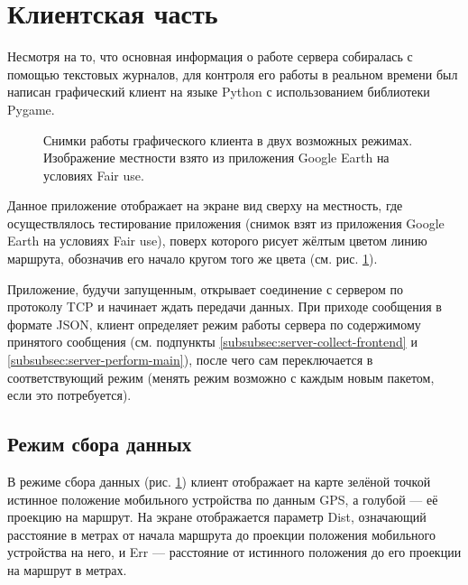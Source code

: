 \section{Клиентская часть}
Несмотря на то, что основная информация о работе сервера собиралась с помощью текстовых журналов, для контроля его работы в реальном времени был написан графический клиент на языке Python с использованием библиотеки Pygame.

\begin{figure}[h]
	\caption{Снимки работы графического клиента в двух возможных режимах. Изображение местности взято из приложения Google Earth\cite{googleearth} на условиях Fair use\cite{enwikifairuse}.}
	\label{fig:gfront}
\end{figure}

Данное приложение отображает на экране вид сверху на местность, где осуществлялось тестирование приложения (снимок взят из приложения Google Earth\cite{googleearth} на условиях Fair use\cite{enwikifairuse}), поверх которого рисует жёлтым цветом линию маршрута, обозначив его начало кругом того же цвета (см. рис. \ref{fig:gfront}).

Приложение, будучи запущенным, открывает соединение с сервером по протоколу TCP и начинает ждать передачи данных. При приходе сообщения в формате JSON, клиент определяет режим работы сервера по содержимому принятого сообщения (см. подпункты \ref{subsubsec:server-collect-frontend} и \ref{subsubsec:server-perform-main}), после чего сам переключается в соответствующий режим (менять режим возможно с каждым новым пакетом, если это потребуется).

\subsection{Режим сбора данных}
В режиме сбора данных (рис. \ref{fig:gfront}) клиент отображает на карте зелёной точкой истинное положение мобильного устройства по данным GPS, а голубой --- её проекцию на маршрут. На экране отображается параметр Dist, означающий расстояние в метрах от начала маршрута до проекции положения мобильного устройства на него, и Err --- расстояние от истинного положения до его проекции на маршрут в метрах.

